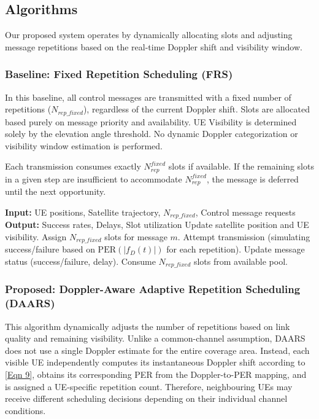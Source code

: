 \documentclass[conference]{IEEEtran}
\begin{document}
\subsection{Algorithms}
\label{sec:algorithms}
Our proposed system operates by dynamically allocating slots and adjusting message repetitions based on the real-time Doppler shift and visibility window.

\subsubsection{Baseline: Fixed Repetition Scheduling (FRS)}
In this baseline, all control messages are transmitted with a fixed number of repetitions ($N_{rep\_fixed}$), regardless of the current Doppler shift. Slots are allocated based purely on message priority and availability. UE Visibility is determined solely by the elevation angle threshold. No dynamic Doppler categorization or visibility window estimation is performed.

Each transmission consumes exactly $N_{rep}^{fixed}$ slots if available. If the remaining slots in a given step are insufficient to accommodate $N_{rep}^{fixed}$, the message is deferred until the next opportunity.

\begin{algorithm}[H]
    \caption{Fixed Repetition Scheduling (FRS)}
    \label{alg:frs}
    \begin{algorithmic}[1]
        \State \textbf{Input:} UE positions, Satellite trajectory, $N_{rep\_fixed}$, Control message requests
        \State \textbf{Output:} Success rates, Delays, Slot utilization
            \State Update satellite position and UE visibility.
                    \State Assign $N_{rep\_fixed}$ slots for message $m$.
                    \State Attempt transmission (simulating success/failure based on $\text{PER}(|f_D(t)|)$ for each repetition).
                    \State Update message status (success/failure, delay).
                    \State Consume $N_{rep\_fixed}$ slots from available pool.
                \EndIf
            \EndFor
        \EndFor
    \end{algorithmic}
\end{algorithm}

\subsubsection{Proposed: Doppler-Aware Adaptive Repetition Scheduling (DAARS)}
This algorithm dynamically adjusts the number of repetitions based on link quality and remaining visibility. Unlike a common-channel assumption, DAARS does not use a single Doppler estimate for the entire coverage area. Instead, each visible UE independently computes its instantaneous Doppler shift according to \ref{Eqn 9}, obtains its corresponding PER from the Doppler-to-PER mapping, and is assigned a UE-specific repetition count. Therefore, neighbouring UEs may receive different scheduling decisions depending on their individual channel conditions.
\end{document}
